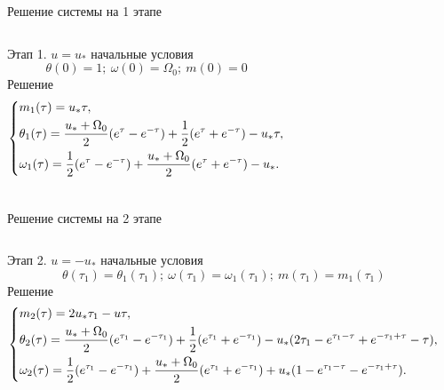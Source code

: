 \documentclass[10pt]{beamer}
\begin{document}
\begin{frame}{Решение системы на 1 этапе}
	\begin{columns}
		Этап 1. $u=u_*$ начальные условия
		\[
			\theta(0)=1;\ \omega(0)=\Omega_0;\ m(0)=0
		\]
		Решение
		\begin{equation}\label{solvefull1stage}
			\left\{ {\begin{aligned}
						 & m_1(\tau) = u_*\tau, \hfill                                                                              \\
						 & \theta_1(\tau) = \frac{u_*+\Omega_0}{2}(e^\tau-e^{-\tau})+\frac{1}{2}(e^\tau+e^{-\tau})-u_*\tau , \hfill \\
						 & \omega_1(\tau) = \frac{1}{2}(e^\tau-e^{-\tau})+\frac{u_*+\Omega_0}{2}(e^\tau+e^{-\tau})-u_*  . \hfill    \\
					\end{aligned}} \right.
		\end{equation}
	\end{columns}
\end{frame}
\begin{frame}{Решение системы на 2 этапе}
	\begin{columns}
		\column{1\textwidth}
		Этап 2. $u=-u_*$ начальные условия
		\[
			\theta(\tau_1)=\theta_1(\tau_1);\ \omega(\tau_1)=\omega_1(\tau_1);\ m(\tau_1)=m_1(\tau_1)
		\]
		Решение
		{\footnotesize
		\begin{equation}\label{final2stage}
			\left\{ {\begin{aligned}
						 & m_2(\tau) = 2u_*\tau_1-u\tau, \hfill                                                                                                                            \\
						 & \theta_2(\tau) = \frac{u_*+\Omega_0}{2}(e^{\tau_1}-e^{-\tau_1})+\frac{1}{2}(e^{\tau_1}+e^{-\tau_1})-u_*(2\tau_1-e^{\tau_1-\tau}+e^{-\tau_1+\tau}-\tau) , \hfill \\
						 & \omega_2(\tau) = \frac{1}{2}(e^{\tau_1}-e^{-\tau_1})+\frac{u_*+\Omega_0}{2}(e^{\tau_1}+e^{-\tau_1})+u_*(1-e^{\tau_1-\tau}-e^{-\tau_1+\tau})  . \hfill           \\
					\end{aligned}} \right.
		\end{equation}
		}
	\end{columns}
\end{frame}
\end{document}
